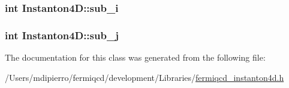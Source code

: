 \hypertarget{class_instanton4_d_a33c37212ef923556b7a1985d9e7cdd36}{
\subsubsection[{sub\_\-i}]{\setlength{\rightskip}{0pt plus 5cm}int {\bf Instanton4D::sub\_\-i}}}
\label{class_instanton4_d_a33c37212ef923556b7a1985d9e7cdd36}
\hypertarget{class_instanton4_d_af73c30a26883977d21e2b2e8921429cf}{
\subsubsection[{sub\_\-j}]{\setlength{\rightskip}{0pt plus 5cm}int {\bf Instanton4D::sub\_\-j}}}
\label{class_instanton4_d_af73c30a26883977d21e2b2e8921429cf}


The documentation for this class was generated from the following file:\begin{DoxyCompactItemize}
\item 
/Users/mdipierro/fermiqcd/development/Libraries/\hyperlink{fermiqcd__instanton4d_8h}{fermiqcd\_\-instanton4d.h}\end{DoxyCompactItemize}
